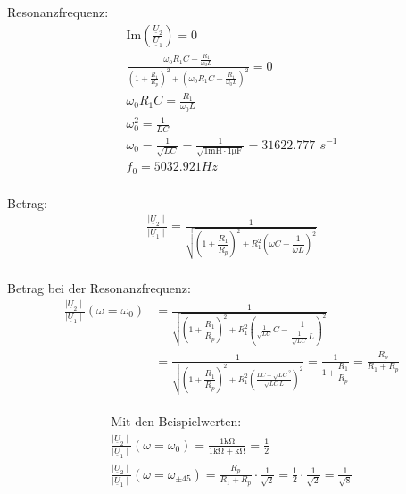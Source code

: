 \documentclass[a4paper, 12pt]{article}
\begin{document}
  Resonanzfrequenz:
    \begin{gather*}
      \text{Im}\left( \frac{ \underline{U}_2 }{ \underline{U}_1 } \right) = 0\\
      \frac{\omega_0 R_1 C - \frac{R_1}{\omega_0 L}}{\left( 1+\frac{R_1}{R_p} \right)^2 + \left( \omega_0 R_1 C - \frac{R_1}{\omega_0 L}\right)^2} = 0\\
      \omega_0 R_1 C = \frac{R_1}{\omega_0 L}\\
      \omega_0^2 = \frac{1}{LC}\\
      \omega_0 = \frac{1}{\sqrt{LC}} = \frac{1}{\sqrt{1 \si{\milli\henry} \cdot 1 \si{\micro\farad}}}=31622.777 \,\ \si{s}^{-1}\\
      f_0 = 5032.921 \si{Hz}\\
    \end{gather*}

  Betrag:
    \begin{gather*}
      \frac{\mid \underline{U}_2 \mid}{\mid \underline{U}_1 \mid} = \frac{1}{  \sqrt{ \left( 1+ \dfrac{R_1}{R_p} \right)^2  + R_1^2 \left( \omega C - \dfrac{1}{\omega L} \right)^2}}\\
    \end{gather*}

  Betrag bei der Resonanzfrequenz:
    \begin{align*}
      \frac{\mid \underline{U}_2 \mid}{\mid \underline{U}_1 \mid} \left( \omega = \omega_0 \right) &= \frac{1}{ \sqrt{ \left( 1+ \dfrac{R_1}{R_p} \right)^2  + R_1^2 \left( \frac{1}{\sqrt{LC}} C - \dfrac{1}{\frac{1}{\sqrt{LC}} L} \right)^2}}\\
      &= \frac{1}{ \sqrt{ \left( 1+ \dfrac{R_1}{R_p} \right)^2  + R_1^2 \left( \frac{LC-\sqrt{LC}^2}{\sqrt{LC}L} \right)^2}} = \frac{1}{1+\dfrac{R_1}{R_p}} = \frac{R_p}{R_1+R_p}\\
    \end{align*}

    \begin{gather*}
      \text{Mit den Beispielwerten:}\\
      \frac{\mid \underline{U}_2 \mid}{\mid \underline{U}_1 \mid} \left( \omega = \omega_0 \right) = \frac{1 \si{\kilo\ohm}}{1 \si{\kilo\ohm} + \si{\kilo\ohm}} = \frac{1}{2}\\
      \frac{\mid \underline{U}_2 \mid}{\mid \underline{U}_1 \mid} \left( \omega = \omega_{\pm 45} \right) = \frac{R_p}{R_1+R_p} \cdot \frac{1}{\sqrt{2}} = \frac{1}{2} \cdot \frac{1}{\sqrt{2}} = \frac{1}{\sqrt{8}}
    \end{gather*}
\end{document}
